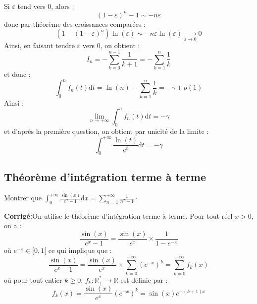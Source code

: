 \documentclass[a4paper,twoside,french,10pt]{VcCours}
\newcommand{\dx}{\text{d}x}
\newcommand{\dt}{\text{d}t}
\newcommand{\corr}{\textbf{Corrigé:}}
\begin{document}
\begin{enumerate}
\begin{align*}
 \end{align*}
 Si $\varepsilon$ tend vers $0$, alors :
 $$ (1- \varepsilon)^n -1 \sim -n \varepsilon$$
 donc par théorème des croissances comparées :
 $$ (1-(1- \varepsilon)^n)\ln(\varepsilon) \sim - n \varepsilon \ln(\varepsilon) \underset{\varepsilon \rightarrow 0}{\longrightarrow} 0$$
 Ainsi, en faisant tendre $\varepsilon$ vers $0$, on obtient :
 $$ I_n = - \sum_{k=0}^{n-1} \dfrac{1}{k+1} = - \sum_{k=1}^n \dfrac{1}{k}$$
 et donc :
 $$ \int_{0}^n f_n(t) \dt = \ln(n)  - \sum_{k=1}^n \dfrac{1}{k} = -\gamma + o(1)$$
 Ainsi :
 $$ \lim_{n \rightarrow + \infty} \int_{0}^n f_n(t) \dt = - \gamma$$
 et d'après la première question, on obtient par unicité de la limite : 
 $$  \int_{0}^{+ \infty} \dfrac{\ln(t)}{e^t} \dt = - \gamma $$
\end{enumerate}

\medskip


\subsection{Théorème d'intégration terme à terme}


\medskip

\begin{Exercice}{} Montrer que $\int_{0}^{+ \infty} \frac{\sin(x)}{e^x-1} \dx = \sum_{n=1}^{+ \infty} \frac{1}{n^2+1}\cdot$
\end{Exercice}

\corr On utilise le théorème d'intégration terme à terme. Pour tout réel $x>0$, on a :
$$ \frac{\sin(x)}{e^x-1}  = \dfrac{\sin(x)}{e^x} \times \dfrac{1}{1-e^{-x}}$$
où $e^{-x} \in [0,1[$ ce qui implique que :
$$ \frac{\sin(x)}{e^x-1}  = \dfrac{\sin(x)}{e^x} \times \sum_{k=0}^{+ \infty} (e^{-x})^k  = \sum_{k=0}^{+ \infty} f_k(x)$$
où pour tout entier $k \geq 0$, $f_k : \mathbb{R}_+^* \rightarrow \mathbb{R}$ est définie par :
$$ f_k(x) = \dfrac{\sin(x)}{e^x} (e^{-x})^k = \sin(x) e^{-(k+1)x}$$
\end{document}
